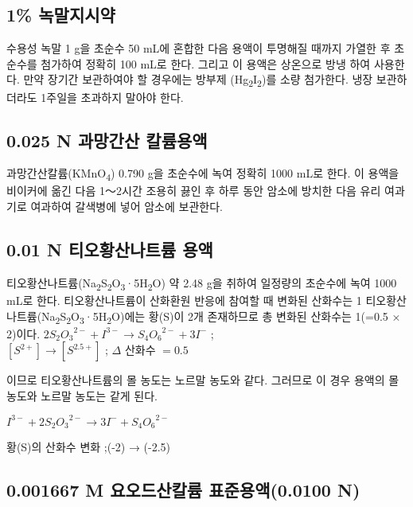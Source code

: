 \documentclass[
]{book}
\begin{document}
\hypertarget{uxb179uxb9d0uxc9c0uxc2dcuxc57d}{%
\subsection{1\% 녹말지시약}\label{uxb179uxb9d0uxc9c0uxc2dcuxc57d}}

수용성 녹말 1 g을 초순수 50 mL에 혼합한 다음 용액이 투명해질 때까지 가열한 후 초순수를 첨가하여 정확히 100 mL로 한다. 그리고 이 용액은 상온으로 방냉 하여 사용한다. 만약 장기간 보관하여야 할 경우에는 방부제 (Hg\textsubscript{2}I\textsubscript{2})를 소량 첨가한다. 냉장 보관하더라도 1주일을 초과하지 말아야 한다.

\hypertarget{n-uxacfcuxb9dduxac04uxc0b0-uxce7cuxb968uxc6a9uxc561}{%
\subsection{0.025 N 과망간산 칼륨용액}\label{n-uxacfcuxb9dduxac04uxc0b0-uxce7cuxb968uxc6a9uxc561}}

과망간산칼륨(KMnO\textsubscript{4}) 0.790 g을 초순수에 녹여 정확히 1000 mL로 한다. 이 용액을 비이커에 옮긴 다음 1～2시간 조용히 끓인 후 하루 동안 암소에 방치한 다음 유리 여과기로 여과하여 갈색병에 넣어 암소에 보관한다.

\hypertarget{n-uxd2f0uxc624uxd669uxc0b0uxb098uxd2b8uxb968-uxc6a9uxc561}{%
\subsection{0.01 N 티오황산나트륨 용액}\label{n-uxd2f0uxc624uxd669uxc0b0uxb098uxd2b8uxb968-uxc6a9uxc561}}

티오황산나트륨(Na\textsubscript{2}S\textsubscript{2}O\textsubscript{3}·5H\textsubscript{2}O) 약 2.48 g을 취하여 일정량의 초순수에 녹여 1000 mL로 한다. 티오황산나트륨이 산화환원 반응에 참여할 때 변화된 산화수는 1 티오황산나트륨(Na\textsubscript{2}S\textsubscript{2}O\textsubscript{3}·5H\textsubscript{2}O)에는 황(S)이 2개 존재하므로 총 변화된 산화수는 1(=0.5 × 2)이다.
\(2{S_{2}O_{3}}^{2-} + I^{3-} → {S_{4}O_{6}}^{2-} + 3I^{-}\) ;\\
\([S^{2+}] → [S^{2.5+}]\) ; \(\Delta\) 산화수 \(= 0.5\)

이므로 티오황산나트륨의 몰 농도는 노르말 농도와 같다. 그러므로 이 경우 용액의 몰 농도와 노르말 농도는 같게 된다.

\(I^{3-} + 2{S_{2}O_{3}}^{2-} → 3I^{-} + {S_{4}O_{6}}^{2-}\)

황(S)의 산화수 변화 ;(-2) → (-2.5)

\hypertarget{m-uxc694uxc624uxb4dcuxc0b0uxce7cuxb968-uxd45cuxc900uxc6a9uxc5610.0100-n}{%
\subsection{0.001667 M 요오드산칼륨 표준용액(0.0100 N)}\label{m-uxc694uxc624uxb4dcuxc0b0uxce7cuxb968-uxd45cuxc900uxc6a9uxc5610.0100-n}}
\end{document}
